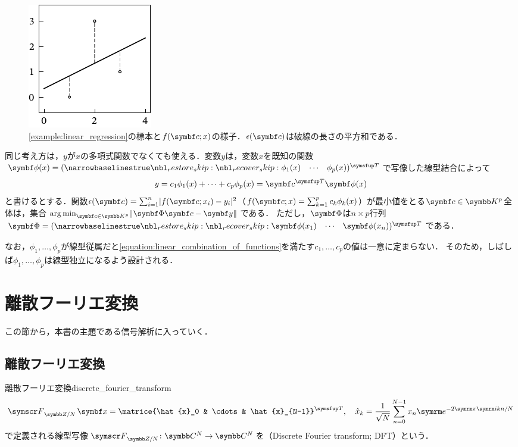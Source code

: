 \documentclass[../../main]{subfiles}
\begin{document}
\begin{figure}[htbp]
  \centering
  \includegraphics{figures/linear_regression.pdf}
  \caption{\cref{example:linear_regression}の標本と\(f(\vect{c};x)\)の様子．\(\epsilon(\vect{c})\)は破線の長さの平方和である．}
\end{figure}

同じ考え方は，\(y\)が\(x\)の多項式関数でなくても使える．変数\(y\)は，変数\(x\)を既知の関数\(\vect{\phi}(x)=\trps{\rowvect{\phi_1(x) & \cdots & \phi_p(x)}}\)で写像した線型結合によって
\begin{equation}
  \label{equation:linear_combination_of_functions}
  y = c_1\phi_1(x)+\dots+c_p\phi_p(x)
  = \trps{\vect{c}}\vect{\phi}(x)
\end{equation}
と書けるとする．関数\(\epsilon(\vect{c})=\sum_{i=1}^n\abs{f(\vect{c};x_i)-y_i}^2\)（\(f(\vect{c};x)=\sum_{k=1}^pc_k\phi_k(x)\)）が最小値をとる\(\vect{c}\in\numset{K}^p\)全体は，集合\(\argmin_{\vect{c}\in\numset{K}^p}\vnorm{\mat{\Phi}\vect{c}-\vect{y}}\)である．
ただし，\(\mat{\Phi}\)は\(n\times p\)行列\(\mat{\Phi}=\trps{\rowvect{\vect{\phi}(x_1) & \cdots & \vect{\phi}(x_n)}}\)である．

なお，\(\phi_1,\dots,\phi_p\)が線型従属だと\cref{equation:linear_combination_of_functions}を満たす\(c_1,\dots,c_p\)の値は一意に定まらない．
そのため，しばしば\(\phi_1,\dots,\phi_p\)は線型独立になるよう設計される．

\section{離散フーリエ変換}

この節から，本書の主題である信号解析に入っていく．

\subsection{離散フーリエ変換}

\begin{definition}{離散フーリエ変換}{discrete_fourier_transform}
  \[
    \dft{N}\vect{x} = \trps{\matrice{\hat{x}_0 & \cdots & \hat{x}_{N-1}}},
    \quad\hat{x}_k = \frac{1}{\sqrt{N}}\sum_{n=0}^{N-1}x_n\napr^{-2\krez\iuni kn/N}
  \]
  で定義される線型写像\(\dft{N}\colon\numset{C}^N\to\numset{C}^N\)を（Discrete Fourier transform; DFT）という．
\end{definition}
\end{document}
